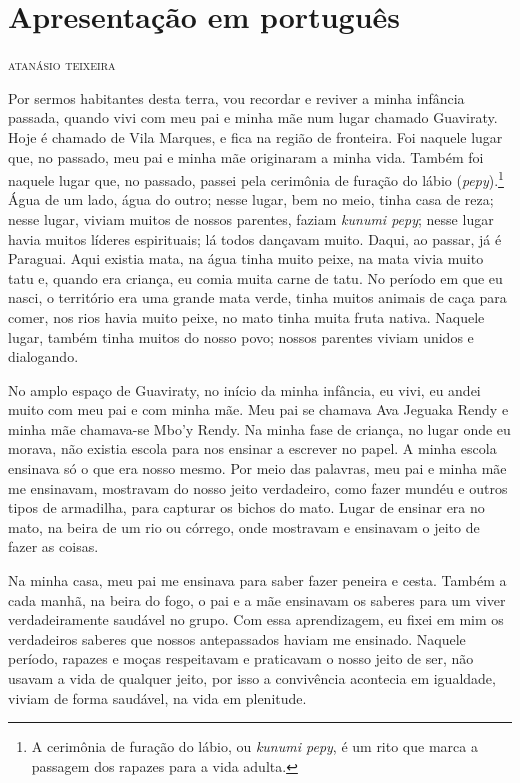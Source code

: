 \chapter*{Apresentação em português\smallskip{}}

\begin{flushright}
\textsc{atanásio teixeira}
\end{flushright}

\noindent{}Por sermos habitantes desta terra, vou recordar e reviver a minha
infância passada, quando vivi com meu pai e minha mãe num lugar chamado
Guaviraty. Hoje é chamado de Vila Marques, e fica na região de fronteira.
Foi naquele lugar que, no passado, meu pai e minha mãe originaram a
minha vida. Também foi naquele lugar que, no passado, passei pela
cerimônia de furação do lábio (\emph{pepy}).\footnote{A cerimônia de furação do lábio, ou \emph{kunumi pepy}, é um rito que marca a passagem dos rapazes para a vida adulta.} Água de um lado, água do outro; nesse lugar, bem no meio, tinha casa de reza; nesse lugar, viviam
muitos de nossos parentes, faziam \emph{kunumi pepy}; nesse lugar havia
muitos líderes espirituais; lá todos dançavam muito. Daqui, ao passar,
já é Paraguai. Aqui existia mata, na água tinha muito peixe, na mata
vivia muito tatu e, quando era criança, eu comia muita carne de tatu. No
período em que eu nasci, o território era uma grande mata verde, tinha
muitos animais de caça para comer, nos rios havia muito peixe, no mato
tinha muita fruta nativa. Naquele lugar, também tinha muitos do nosso
povo; nossos parentes viviam unidos e dialogando.

No amplo espaço de Guaviraty, no início da minha infância, eu vivi, eu
andei muito com meu pai e com minha mãe. Meu pai se chamava Ava Jeguaka
Rendy e minha mãe chamava-se Mbo'y Rendy. Na minha fase de criança, no
lugar onde eu morava, não existia escola para nos ensinar a escrever no
papel. A minha escola ensinava só o que era nosso mesmo. Por meio das
palavras, meu pai e minha mãe me ensinavam, mostravam do nosso jeito
verdadeiro, como fazer mundéu e outros tipos de armadilha, para capturar
os bichos do mato. Lugar de ensinar era no mato, na beira de um rio ou
córrego, onde mostravam e ensinavam o jeito de fazer as coisas.

Na minha casa, meu pai me ensinava para saber fazer peneira e cesta.
Também a cada manhã, na beira do fogo, o pai e a mãe ensinavam os
saberes para um viver verdadeiramente saudável no grupo. Com essa
aprendizagem, eu fixei em mim os verdadeiros saberes que nossos
antepassados haviam me ensinado. Naquele período, rapazes e moças
respeitavam e praticavam o nosso jeito de ser, não usavam a vida de
qualquer jeito, por isso a convivência acontecia em igualdade, viviam de
forma saudável, na vida em plenitude.

